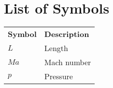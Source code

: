 \chapter*{List of Symbols}

\begin{longtable}[l]{p{50pt} p{200pt}}
\textbf{Symbol}	& \textbf{Description} \\
$L$	 	& Length\\
$Ma$ & Mach number\\
$p$	 	& Pressure
\end{longtable}

